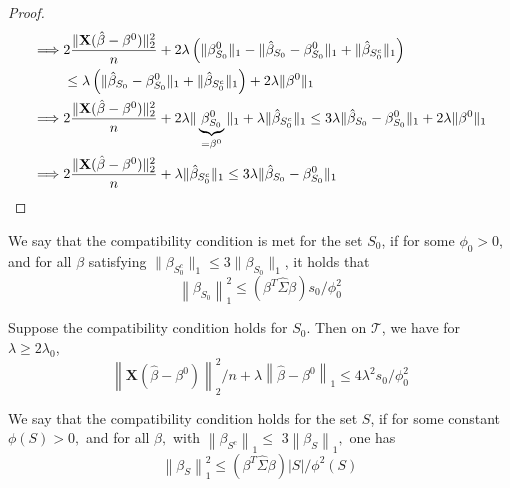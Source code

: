 \begin{proof}
\begin{align*}
        \implies & 2 \frac{\| \mathbf{X} (\hat{\beta}-\beta^{0})\|_{2}^{2}}{n} + 2 \lambda \left( \|\beta_{S_{0}}^{0} \|_{1} - \|\hat{\beta}_{S_{0}}-\beta_{S_{0}}^{0} \|_{1}+ \|\hat{\beta}_{S_{0}^{c}} \|_{1} \right)                                                                 \\
                 & \leq \lambda \left( \| \hat{\beta}_{S_{0}}-\beta_{S_{0}}^{0} \|_{1} + \|\hat{\beta}_{S_{0}^{c}} \|_{1} \right) + 2 \lambda \|\beta^{0} \|_{1}                                                                                                                \\
        \implies & 2 \frac{\| \mathbf{X} (\hat{\beta}-\beta^{0})\|_{2}^{2}}{n} + 2 \lambda \|\underbrace{\beta_{S_{0}}^{0}}_{= \beta^0} \|_{1} + \lambda \|\hat{\beta}_{S_{0}^{c}} \|_{1} \leq 3 \lambda \| \hat{\beta}_{S_{0}}-\beta_{S_{0}}^{0} \|_{1} + 2 \lambda \|\beta^{0} \|_{1} \\
        \implies & 2\frac{ \|\mathbf{X} (\hat{\beta}-\beta^{0} ) \|_{2}^{2}}{n} + \lambda \|\hat{\beta}_{S_{0}^{c}} \|_{1} \leq 3 \lambda \|\hat{\beta}_{S_{0}}-\beta_{S_{0}}^{0} \|_{1}
    \end{align*}
\end{proof}

\begin{theorem}
    We say that the compatibility condition is met for the set $S_{0}$, if for some $\phi_{0}>0$, and for all $\beta$ satisfying $ \|\beta_{S_{0}^{c}} \|_{1} \leq 3 \|\beta_{S_{0}} \|_{1}$, it holds that
    $$
        \left\| \beta_{S_{0}} \right\|_{1}^{2} \leq\left(\beta^{T} \hat{\Sigma} \beta\right) s_{0} / \phi_{0}^{2}
    $$
\end{theorem}

\begin{theorem}[Theorem 6.1.]
    Suppose the compatibility condition holds for $S_{0}$. Then on $\mathscr{T}$, we have for $\lambda \geq 2 \lambda_{0}$,
    $$
        \left\|\mathbf{X}\left(\hat{\beta}-\beta^{0}\right)\right\|_{2}^{2} / n+\lambda\left\|\hat{\beta}-\beta^{0}\right\|_{1} \leq 4 \lambda^{2} s_{0} / \phi_{0}^{2}
    $$
\end{theorem}

\begin{theorem}
    We say that the compatibility condition holds for the set $S$, if for some constant $\phi(S)>0,$ and for all $\beta,$ with $\left\|\beta_{S^{c}}\right\|_{1} \leq$ $3\left\|\beta_{S}\right\|_{1},$ one has
    $$
        \left\|\beta_{S}\right\|_{1}^{2} \leq\left(\beta^{T} \hat{\Sigma} \beta\right)|S| / \phi^{2}(S)
    $$
\end{theorem}

